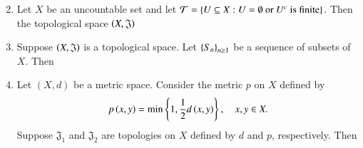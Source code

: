 \documentclass[journal]{IEEEtran}
\begin{document}
\begin{enumerate}
\begin{enumerate}
\begin{multicols}{2}
\end{multicols}
\end{enumerate}
\item Let $X$ be an uncountable set and let
$ \mathcal{T} = \left\{ U \subseteq X : U = \emptyset \text{ or } U^c \text{ is finite} \right\} $.
Then the topological space $\left(X, \mathfrak{J}\right)$
\begin{enumerate}
\end{enumerate}
\item Suppose $\left(X, \mathfrak{J}\right)$ is a topological space. Let $\left\{S_n\right\}_{n \geq 1}$ be a sequence of subsets of $X$. Then
\begin{enumerate}
\end{enumerate}
\item Let $(X, d)$ be a metric space. Consider the metric $p$ on $X$ defined by $$p\left(x, y\right) = \min\left\{1, \frac{1}{2}d\left(x, y\right)\right\}, \quad x, y \in X.$$ Suppose $\mathfrak{J}_{1}$ and $\mathfrak{J}_{2}$ are topologies on $X$ defined by $d$ and $p$, respectively. Then
\begin{enumerate}

\end{enumerate}
\end{enumerate}
\end{document}
